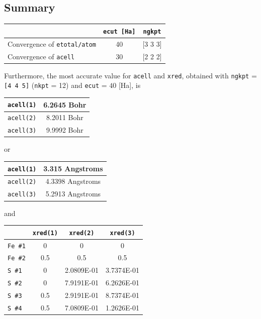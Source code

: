 \documentclass[11pt,a4paper]{article}
\begin{document}
\subsection{Summary}
\begin{center}
\begin{tabular}{|l|c|c|}
\cline{2-3}   
\multicolumn{1}{c|}{}&\texttt{ecut [Ha]} & \texttt{ngkpt} \\
\hline
\multirow{1}{*}{Convergence of \texttt{etotal/atom}} & 40 & [3 3 3]\\
\hline
\multirow{1}{*}{Convergence of \texttt{acell}} & 30 & [2 2 2]\\   
\hline           
\end{tabular}
\end{center}
Furthermore, the most accurate value for \texttt{acell} and \texttt{xred}, obtained with \texttt{ngkpt} = \texttt{[4 4 5]} (\texttt{nkpt} = 12) and \texttt{ecut} = $40$ [Ha], is 
\begin{center}
\begin{tabular}{|c|c|}
\hline 
\texttt{acell(1)} & 6.2645 Bohr\\
\hline
\texttt{acell(2)} & 8.2011 Bohr\\
\hline
\texttt{acell(3)} & 9.9992 Bohr\\
\hline
\end{tabular}
\end{center}
or
\begin{center}
\begin{tabular}{|c|c|}
\hline
\texttt{acell(1)} & 3.315 Angstroms\\
\hline
\texttt{acell(2)} & 4.3398 Angstroms\\
\hline
\texttt{acell(3)} & 5.2913 Angstroms\\
\hline
\end{tabular}
\end{center}
and
\begin{center}
\begin{tabular}{|l|c|c|c|}
\cline{2-4}
\multicolumn{1}{l|}{}&\texttt{xred(1)} & \texttt{xred(2)} & \texttt{xred(3)}\\
\hline
\texttt{Fe \#1} & 0 & 0 & 0 \\
\hline
\texttt{Fe \#2} & 0.5 & 0.5 & 0.5\\
\hline
\texttt{S \#1} & 0 & 2.0809E-01 & 3.7374E-01\\
\hline
\texttt{S \#2} & 0& 7.9191E-01 & 6.2626E-01\\
\hline
\texttt{S \#3} & 0.5 & 2.9191E-01 & 8.7374E-01\\
\hline
\texttt{S \#4} & 0.5 & 7.0809E-01 & 1.2626E-01\\
\hline
\end{tabular}
\end{center}
\end{document}
